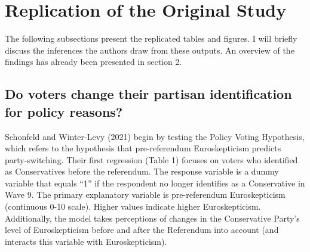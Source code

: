 \documentclass[12pt,letterpaper]{article}
\begin{document}
	\section{Replication of the Original Study}
	The following subsections present the replicated tables and figures. I will briefly discuss the inferences the authors draw from these outputs. An overview of the findings has already been presented in section 2. 
	
	\subsection{Do voters change their partisan identification for policy reasons?}
	Schonfeld and Winter-Levy (2021) begin by testing the Policy Voting Hypothesis, which refers to the hypothesis that pre-referendum Euroskepticism predicts party-switching. Their first regression (Table 1) focuses on voters who identified as Conservatives before the referendum. 
	The response variable is a dummy variable that equals “1” if the respondent no longer identifies as a Conservative in Wave 9. The primary explanatory variable is pre-referendum Euroskepticism (continuous 0-10 scale). Higher values indicate higher Euroskepticism. Additionally, the model takes perceptions of changes in the Conservative Party’s level of Euroskepticism before and after the Referendum into account (and interacts this variable with Euroskepticism). 
	
\end{document}
